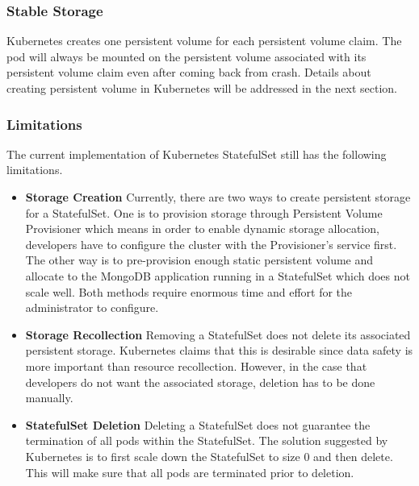 \documentclass[sigconf]{acmart}
\begin{document}
\subsubsection{Stable Storage}
Kubernetes creates one persistent volume for each persistent volume claim. The pod will always be mounted on the persistent volume associated with its persistent volume claim even after coming back from crash. Details about creating persistent volume in Kubernetes will be addressed in the next section.

\subsubsection{Limitations} 
The current implementation of Kubernetes StatefulSet still has the following limitations.
\begin{itemize}
    \item \textbf{Storage Creation} Currently, there are two ways to create persistent storage for a StatefulSet. One is to provision storage through Persistent Volume Provisioner which means in order to enable dynamic storage allocation, developers have to configure the cluster with the Provisioner's service first. The other way is to pre-provision enough static persistent volume and allocate to the MongoDB application running in a StatefulSet which does not scale well. Both methods require enormous time and effort for the administrator to configure.
    \item \textbf{Storage Recollection} Removing a StatefulSet does not delete its associated persistent storage. Kubernetes claims that this is desirable since data safety is more important than resource recollection. However, in the case that developers do not want the associated storage, deletion has to be done manually.
    \item \textbf{StatefulSet Deletion} Deleting a StatefulSet does not guarantee the termination of all pods within the StatefulSet. The solution suggested by Kubernetes is to first scale down the StatefulSet to size 0 and then delete. This will make sure that all pods are terminated prior to deletion.
\end{itemize}
\end{document}
